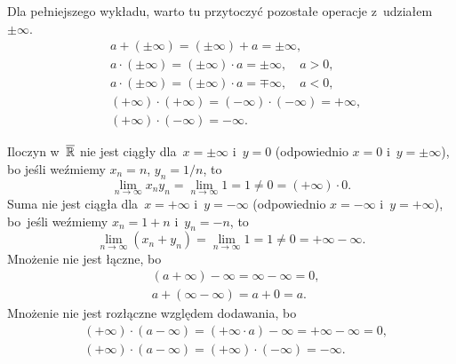 \documentclass[a4paper,11pt]{article}
\numberwithin{equation}{section}
\begin{document}
\vspace{0em}


\noindent
{} Dla pełniejszego wykładu, warto tu przytoczyć pozostałe
operacje z~udziałem $\pm \infty$.
\begin{equation}
  \label{eq:Lojasiewicz-Wstep-do-teorii-ETC-01}
  \begin{split}
    &a + ( \pm \infty ) = ( \pm \infty ) + a = \pm \infty, \\
    &a \cdot ( \pm \infty ) = ( \pm \infty ) \cdot a = \pm \infty,
    \quad a > 0, \\
    &a \cdot ( \pm \infty ) = ( \pm \infty ) \cdot a = \mp \infty,
    \quad a < 0, \\
    &( +\infty ) \cdot ( +\infty ) = ( -\infty ) \cdot ( -\infty )
    = +\infty, \\
    &( +\infty ) \cdot ( -\infty ) = -\infty.
  \end{split}
\end{equation}

\VerSpaceFour





\noindent
{} Iloczyn w~$\overline{ \mathbb{R} }$ nie jest ciągły
dla~$x = \pm \infty$ i~$y = 0$ (odpowiednio $x = 0$
i~$y = \pm \infty$), bo jeśli weźmiemy $x_{ n } = n$, $y_{ n } = 1 / n$,
to
\begin{equation}
  \label{eq:LojasiewiczWDTFRz-02}
  \lim\limits_{ n \to \infty } x_{ n } y_{ n }
  = \lim\limits_{ n \to \infty } 1 = 1 \neq 0 = ( +\infty ) \cdot 0.
\end{equation}
Suma nie jest ciągła dla~$x = +\infty$ i~$y = -\infty$ (odpowiednio
$x = -\infty$ i~$y = +\infty$), bo~jeśli weźmiemy $x_{ n } = 1 + n$
i~$y_{ n } = -n$, to
\begin{equation}
  \label{eq:LojasiewiczWDTFRz-03}
  \lim\limits_{ n \to \infty } ( x_{ n } + y_{ n } )
  = \lim\limits_{ n \to \infty } 1 = 1 \neq 0 = +\infty - \infty.
\end{equation}
Mnożenie nie jest łączne, bo
\begin{equation}
  \label{eq:LojasiewiczWDTFRz-04}
  \begin{split}
    &( a + \infty ) - \infty = \infty - \infty = 0, \\
    &a + ( \infty - \infty ) = a + 0 = a.
  \end{split}
\end{equation}
Mnożenie nie jest rozłączne względem dodawania, bo
\begin{equation}
  \label{eq:LojasiewiczWDTFRz-05}
  \begin{split}
    &( +\infty ) \cdot ( a - \infty ) = ( +\infty \cdot a ) - \infty
    = +\infty - \infty = 0, \\
    &( +\infty ) \cdot ( a - \infty ) = ( +\infty ) \cdot ( -\infty )
    = -\infty.
  \end{split}
\end{equation}
\end{document}

